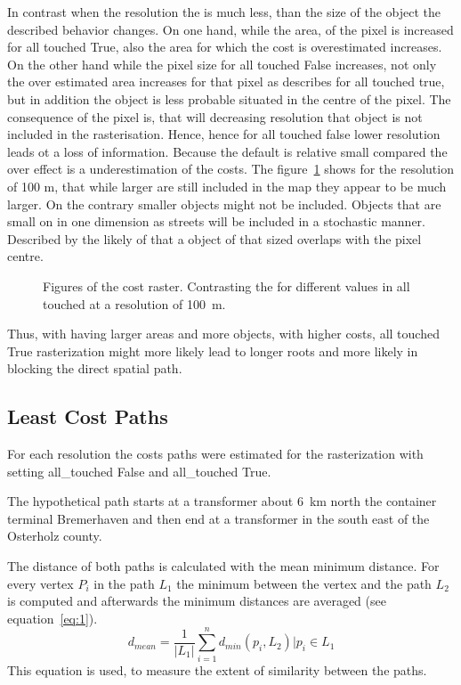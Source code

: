 In contrast when the resolution the is much less, than the size of the object the described behavior changes.
On one hand, while the area, of the pixel is increased for all touched True, also the area for which the cost is overestimated increases.
On the other hand while the pixel size for all touched  False increases, not only the over estimated area increases for that pixel as describes for all touched true, but in addition the object is less probable situated in the centre of the pixel.
The consequence of the pixel is, that will decreasing resolution that object is not included in the rasterisation.
Hence, hence for all touched false lower resolution  leads ot a loss of information.
Because the default is relative small compared the over effect is a underestimation of the costs.
The figure~\ref{fig:costs_100m} shows for the resolution of 100 m, that while larger are still included in the map they appear to be much larger.
On the contrary smaller objects might not be included.
Objects that are small on in one dimension as streets will be included in a stochastic manner.
Described by the likely of that a object of that sized overlaps with the pixel centre.
\begin{figure}
	\centering

	\qquad
	\caption{Figures of the cost raster. Contrasting the for different values in all touched at a resolution of 100~m.}
	\label{fig:costs_100m}
\end{figure}
Thus, with having larger areas and more objects, with higher costs, all touched True rasterization might more likely lead to longer roots and more likely in blocking the  direct spatial path.

\subsection{Least Cost Paths}\label{subsec:least-cost-paths}
For each resolution the costs paths were estimated for the rasterization with setting all\_touched False
and all\_touched True.

The hypothetical path starts at a transformer about 6~km north the container terminal Bremerhaven and then end at a transformer in the south east of the Osterholz county. 

The distance of both paths is calculated with the mean minimum distance.
For every vertex $P_i$ in the path $L_1$ the minimum between the vertex and the path $L_2$
is computed and afterwards the minimum distances are averaged (see equation~\ref{eq:1}).
\begin{equation}
	\label{eq:1}
	d_{mean} = \frac{1}{|L_1|} \sum_{i=1}^{n} d_{min}(p_i, L_2) \bigg\vert p_i \in L_1
\end{equation}
This equation is used, to measure the extent of similarity between the paths.

